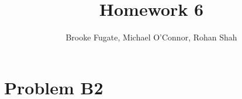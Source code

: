 \documentclass[12pt]{article}
\begin{document}
\pagestyle{plain}
\titleformat{\subsection}[runin]
  {\normalfont\large\bfseries}{\thesubsection}{1em}{}
\titleformat{\subsubsection}[runin]
  {\bfseries}{}{1em}{}

\title{Homework 6}
\author{Brooke Fugate, Michael O'Connor, Rohan Shah}
\date{}

\maketitle

\section*{Problem B2}
\end{document}
